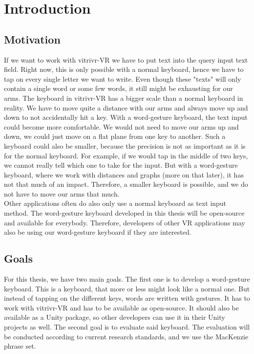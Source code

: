 \chapter{Introduction}

\section{Motivation}
If we want to work with vitrivr-VR we have to put text into the query input text field. Right now, this is only possible with a normal keyboard, hence we have to tap on every single letter we want to write. Even though these "texts" will only contain a single word or some few words, it still might be exhausting for our arms. The keyboard in vitrivr-VR has a bigger scale than a normal keyboard in reality. We have to move quite a distance with our arms and always move up and down to not accidentally hit a key. With a word-gesture keyboard, the text input could become more comfortable. We would not need to move our arms up and down, we could just move on a flat plane from one key to another. Such a keyboard could also be smaller, because the precision is not as important as it is for the normal keyboard. For example, if we would tap in the middle of two keys, we cannot really tell which one to take for the input. But with a word-gesture keyboard, where we work with distances and graphs (more on that later), it has not that much of an impact. Therefore, a smaller keyboard is possible, and we do not have to move our arms that much.\\
Other applications often do also only use a normal keyboard as text input method. The word-gesture keyboard developed in this thesis will be open-source and available for everybody. Therefore, developers of other VR applications may also be using our word-gesture keyboard if they are interested.

\section{Goals}
For this thesis, we have two main goals. The first one is to develop a word-gesture keyboard. This is a keyboard, that more or less might look like a normal one. But instead of tapping on the different keys, words are written with gestures. It has to work with vitrivr-VR and has to be available as open-source. It should also be available as a Unity package, so other developers can use it in their Unity projects as well. The second goal is to evaluate said keyboard. The evaluation will be conducted according to current research standards, and we use the MacKenzie phrase set.
